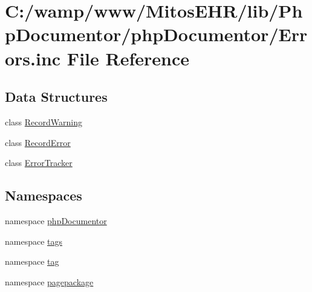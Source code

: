 \hypertarget{_errors_8inc}{\section{\-C\-:/wamp/www/\-Mitos\-E\-H\-R/lib/\-Php\-Documentor/php\-Documentor/\-Errors.inc \-File \-Reference}
\label{_errors_8inc}
}
\subsection*{\-Data \-Structures}
\begin{DoxyCompactItemize}
\item 
class \hyperlink{class_record_warning}{\-Record\-Warning}
\item 
class \hyperlink{class_record_error}{\-Record\-Error}
\item 
class \hyperlink{class_error_tracker}{\-Error\-Tracker}
\end{DoxyCompactItemize}
\subsection*{\-Namespaces}
\begin{DoxyCompactItemize}
\item 
namespace \hyperlink{namespacephp_documentor}{php\-Documentor}
\item 
namespace \hyperlink{namespacetags}{tags}
\item 
namespace \hyperlink{namespacetag}{tag}
\item 
namespace \hyperlink{namespacepagepackage}{pagepackage}
\end{DoxyCompactItemize}
